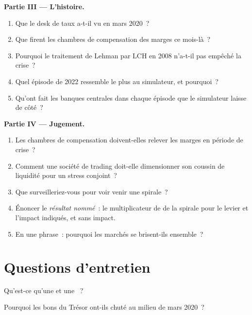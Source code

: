 \begin{problem}
\medskip\noindent\textbf{Partie III --- L'histoire.}
\begin{enumerate}[resume]
\item Que le desk de taux a-t-il vu en mars 2020~?
\item Que firent les chambres de compensation des marges ce mois-là~?
\item Pourquoi le traitement de Lehman par LCH en 2008 n'a-t-il pas empêché la crise~?
\item Quel épisode de 2022 ressemble le plus au simulateur, et pourquoi~?
\item Qu'ont fait les banques centrales dans chaque épisode que le simulateur laisse de côté~?
\end{enumerate}

\medskip\noindent\textbf{Partie IV --- Jugement.}
\begin{enumerate}[resume]
\item Les chambres de compensation doivent-elles relever les marges en période de crise~?
\item Comment une société de trading doit-elle dimensionner son coussin de liquidité pour un stress conjoint~?
\item Que surveilleriez-vous pour voir venir une spirale~?
\item Énoncer le \emph{résultat nommé}~: le multiplicateur de  de la spirale pour le levier et l'impact indiqués, et sans impact.
\item En une phrase~: pourquoi les marchés se brisent-ils ensemble~?
\end{enumerate}
\end{problem}

\section{Questions d'entretien}

\begin{interviewq}\label{iq:m3:when-markets-break-together:1}
Qu'est-ce qu'une  et une ~?
\end{interviewq}

\begin{interviewq}\label{iq:m3:when-markets-break-together:2}
Pourquoi les bons du Trésor ont-ils chuté au milieu de mars 2020~?
\end{interviewq}

